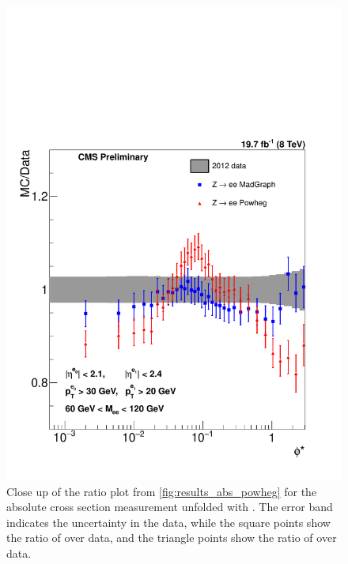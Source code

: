 \begin{figure}[!p]
    \centering
    \includegraphics[width=\textwidth]{figures/ZShape_Ratioelec_PH_Abs_Dressed.pdf}
    \caption[
        Close up of the ratio plot from \cref{fig:results_abs_powheg} for the
        absolute cross section measurement unfolded with \PPsixZtwo.
    ]{
        Close up of the ratio plot from \cref{fig:results_abs_powheg} for the
        absolute cross section measurement unfolded with \PPsixZtwo. The error
        band indicates the uncertainty in the data, while the square points
        show the ratio of \MADGRAPH over data, and the triangle points show the
        ratio of \PPsixZtwo over data.
    }
    \label{fig:results_ratio_abs_powheg}
\end{figure}
